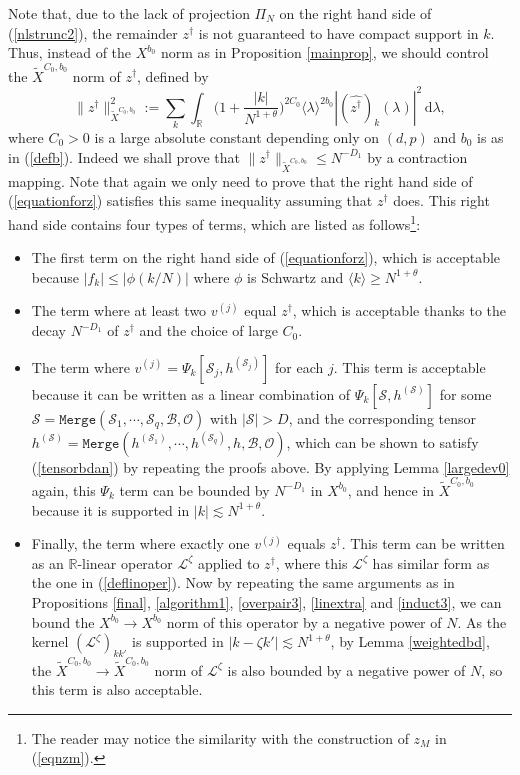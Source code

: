 \documentclass[11 pt,reqno]{amsart}
\theoremstyle{definition}
\theoremstyle{remark}
\numberwithin{equation}{section}
\newcommand{\Sc}{\mathcal{S}}
\newcommand{\Rb}{\mathbb{R}}
\newcommand{\Bs}{\mathscr{B}}
\newcommand{\Os}{\mathscr{O}}
\newcommand{\Ls}{\mathscr{L}}
\begin{document}
{Note that, due to the lack of projection $\Pi_N$ on the right hand side of (\ref{nlstrunc2}), the remainder $z^\dagger$ is not guaranteed to have compact support in $k$. Thus, instead of the $X^{b_0}$ norm as in Proposition \ref{mainprop}, we should control the $\widetilde{X}^{C_0,b_0}$ norm of $z^\dagger$, defined by
\[\|z^\dagger\|_{\widetilde{X}^{C_0,b_0}}^2:=\sum_{k}\int_\Rb\bigg(1+\frac{|k|}{N^{1+\theta}}\bigg)^{2C_0}\langle \lambda\rangle^{2b_0}|(\widehat{z^\dagger})_k(\lambda)|^2\,\mathrm{d}\lambda,\] where $C_0>0$ is a large absolute constant depending only on $(d,p)$ and $b_0$ is as in (\ref{defb}). Indeed we shall prove that $\|z^\dagger\|_{\widetilde{X}^{C_0,b_0}}\leq N^{-D_1}$ by a contraction mapping. Note that again we only need to prove that the right hand side of (\ref{equationforz}) satisfies this same inequality assuming that $z^\dagger$ does. This right hand side contains four types of terms, which are listed as follows\footnote{The reader may notice the similarity with the construction of $z_M$ in (\ref{eqnzm}).}:
\begin{itemize}
\item The first term on the right hand side of (\ref{equationforz}), which is acceptable because $|f_k|\leq|\phi(k/N)|$ where $\phi$ is Schwartz and $\langle k\rangle\geq N^{1+\theta}$.
\item The term where at least two $v^{(j)}$ equal $z^\dagger$, which is acceptable thanks to the decay $N^{-D_1}$ of $z^\dagger$ and the choice of large $C_0$.
\item The term where $v^{(j)}=\Psi_k[\Sc_j,h^{(\Sc_j)}]$ for each $j$. This term is acceptable because it can be written as a linear combination of $\Psi_k[\Sc,h^{(\Sc)}]$ for some $\Sc=\mathtt{Merge}(\Sc_1,\cdots,\Sc_q,\Bs,\Os)$ with $|\Sc|>D$, and the corresponding tensor $h^{(\Sc)}=\mathtt{Merge}(h^{(\Sc_1)},\cdots,h^{(\Sc_q)},h,\Bs,\Os)$, which can be shown to satisfy (\ref{tensorbdan}) by repeating the proofs above. By applying Lemma \ref{largedev0} again, this $\Psi_k$ term can be bounded by $N^{-D_1}$ in $X^{b_0}$, and hence in $\widetilde{X}^{C_0,b_0}$ because it is supported in $|k|\lesssim N^{1+\theta}$.
\item Finally, the term where exactly one $v^{(j)}$ equals $z^\dagger$. This term can be written as an $\Rb$-linear operator $\Ls^\zeta$ applied to $z^\dagger$, where this $\Ls^\zeta$ has similar form as the one in (\ref{deflinoper}). Now by repeating the same arguments as in Propositions \ref{final}, \ref{algorithm1}, \ref{overpair3}, \ref{linextra} and \ref{induct3}, we can bound the $X^{b_0}\to X^{b_0}$ norm of this operator by a negative power of $N$. As the kernel $(\Ls^\zeta)_{kk'}$ is supported in $|k-\zeta k'|\lesssim N^{1+\theta}$, by Lemma \ref{weightedbd}, the $\widetilde{X}^{C_0,b_0}\to \widetilde{X}^{C_0,b_0}$ norm of $\Ls^\zeta$ is also bounded by a negative power of $N$, so this term is also acceptable.
\end{itemize}

}
\end{document}
